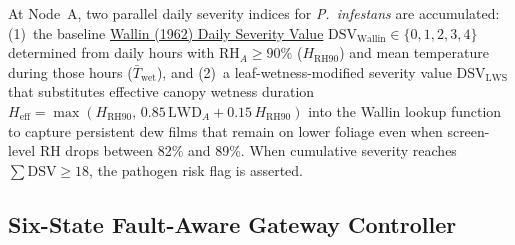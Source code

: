 \documentclass[10pt,twocolumn,a4paper]{article}
\begin{document}
At Node~A, two parallel daily severity indices for \textit{P.\ infestans} are accumulated: (1)~the baseline \href{https://ipm.ucanr.edu/DISEASE/DATABASE/potatolateblight.html}{Wallin (1962) Daily Severity Value} $\mathrm{DSV}_{\text{Wallin}} \in \{0,1,2,3,4\}$ \cite{wallin1962,msu_svalue} determined from daily hours with $\mathrm{RH}_A \ge 90\%$ ($H_{\mathrm{RH90}}$) and mean temperature during those hours ($\bar{T}_{\text{wet}}$), and (2)~a leaf-wetness-modified severity value $\mathrm{DSV}_{\mathrm{LWS}}$ that substitutes effective canopy wetness duration $H_{\text{eff}} = \max(H_{\mathrm{RH90}},\, 0.85\,\mathrm{LWD}_A + 0.15\,H_{\mathrm{RH90}})$ into the Wallin lookup function to capture persistent dew films that remain on lower foliage even when screen-level $\mathrm{RH}$ drops between 82\% and 89\%. When cumulative severity reaches $\sum \mathrm{DSV} \ge 18$, the pathogen risk flag is asserted.

\subsection{Six-State Fault-Aware Gateway Controller}
\end{document}
